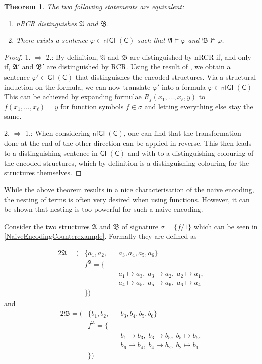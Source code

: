 \documentclass[a4paper,11pt,DIV=15]{scrartcl} %
\renewcommand{\phi}{\varphi}
\theoremstyle{plain}
\newtheorem{theorem}{Theorem}
\theoremstyle{definition}
\newcommand{\GFC}{\mathsf{GF}(\mathsf{C})}
\begin{document}
\begin{theorem}
	The two following statements are equivalent:
	\begin{enumerate}
		\item nRCR distinguishes $\mathfrak A$ and $\mathfrak B$.
		\item There exists a sentence $\phi\in \mathsf{nfGF}(\mathsf C)$ such that $\mathfrak A\models \phi$ and $\mathfrak B\not\models \phi$.
	\end{enumerate}
\end{theorem}
\begin{proof}
	1. $\Rightarrow$ 2.:
	By definition, $\mathfrak A$ and $\mathfrak B$ are distinguished by nRCR if, and only if, $\mathfrak A'$ and $\mathfrak B'$ are distinguished by RCR.
	Using the result of \cite{scheidt2025ColorRefinement}, we obtain a sentence $\varphi'\in\GFC$ that distinguishes the encoded structures.
	Via a structural induction on the formula, we can now translate $\varphi'$ into a formula $\phi\in \mathsf{nfGF}(\mathsf C)$
	This can be achieved by expanding formulae $R_f(x_1,\dots,x_\ell,y)$ to $f(x_1,\dots,x_\ell)=y$ for function symbols $f\in\sigma$ and letting everything else stay the same.
	
	2. $\Rightarrow$ 1.:
	When considering $\mathsf{nfGF}(\mathsf C)$, one can find that the transformation done at the end of the other direction can be applied in reverse.
	This then leads to a distinguishing sentence in $\GFC$ and with \cite{scheidt2025ColorRefinement} to a distinguishing colouring of the encoded structures, which by definition is a distinguishing colouring for the structures themselves.
\end{proof}

While the above theorem results in a nice characterisation of the naive encoding, the nesting of terms is often very desired when using functions.
However, it can be shown that nesting is too powerful for such a naive encoding.

Consider the two structures $\mathfrak A$ and $\mathfrak B$ of signature $\sigma=\{f/1\}$ which can be seen in \cref{NaiveEncodingCounterexample}.
Formally they are defined as

\begin{alignat*}{2}
	\mathfrak A = (&\{a_1, a_2, &&a_3, a_4, a_5, a_6\} \\ 
	& f^{\mathfrak A} = \{&& \\
	& && a_1 \mapsto a_3,\; a_3 \mapsto a_2,\; a_2 \mapsto a_1, \\
	& && a_4 \mapsto a_5,\; a_5 \mapsto a_6,\; a_6 \mapsto a_4 \\
	&\})
\end{alignat*}
and
\begin{alignat*}{2}
	\mathfrak B = (&\{b_1, b_2, &&b_3, b_4, b_5, b_6\} \\ 
	& f^{\mathfrak A} = \{&& \\
	& && b_1 \mapsto b_3,\; b_3 \mapsto b_5,\; b_5 \mapsto b_6, \\
	& && b_6 \mapsto b_4,\; b_4 \mapsto b_2,\; b_2 \mapsto b_1 \\
	&\})
\end{alignat*}
\end{document}
